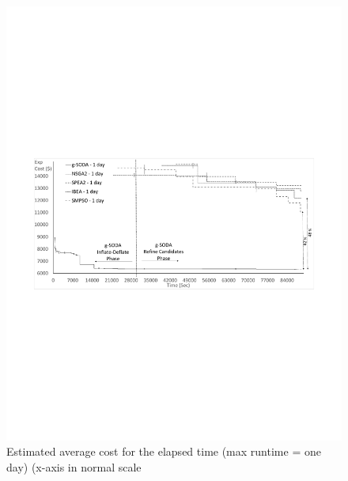 \documentclass[a4paper, 12pt]{article} %
\begin{document}
\begin{figure}
	\begin{minipage}{.5\textwidth}
	\begin{center}
	\includegraphics[width=\textwidth]{images/sodavsjmetal1day.pdf}
	\caption{Estimated average cost for the elapsed time (max runtime = one day) (x-axis in normal scale}
	\label{fig:GraphsForTime_24hours}       %
\end{center}
\end{minipage}
\hfill
\begin{minipage}{.5\textwidth}
	\begin{center}

\end{center}
\end{minipage}
\end{figure}
\end{document}
